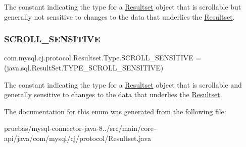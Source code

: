 The constant indicating the type for a {\ttfamily \mbox{\hyperlink{interfacecom_1_1mysql_1_1cj_1_1protocol_1_1_resultset}{Resultset}}} object that is scrollable but generally not sensitive to changes to the data that underlies the {\ttfamily \mbox{\hyperlink{interfacecom_1_1mysql_1_1cj_1_1protocol_1_1_resultset}{Resultset}}}. \mbox{\label{enumcom_1_1mysql_1_1cj_1_1protocol_1_1_resultset_1_1_type_a61adf90ea3124efe223bb2b80b921233}} 
\subsubsection{\texorpdfstring{S\+C\+R\+O\+L\+L\+\_\+\+S\+E\+N\+S\+I\+T\+I\+VE}{SCROLL\_SENSITIVE}}
{\footnotesize\ttfamily com.\+mysql.\+cj.\+protocol.\+Resultset.\+Type.\+S\+C\+R\+O\+L\+L\+\_\+\+S\+E\+N\+S\+I\+T\+I\+VE =(java.\+sql.\+Result\+Set.\+T\+Y\+P\+E\+\_\+\+S\+C\+R\+O\+L\+L\+\_\+\+S\+E\+N\+S\+I\+T\+I\+VE)}

The constant indicating the type for a {\ttfamily \mbox{\hyperlink{interfacecom_1_1mysql_1_1cj_1_1protocol_1_1_resultset}{Resultset}}} object that is scrollable and generally sensitive to changes to the data that underlies the {\ttfamily \mbox{\hyperlink{interfacecom_1_1mysql_1_1cj_1_1protocol_1_1_resultset}{Resultset}}}. 

The documentation for this enum was generated from the following file\+:\begin{DoxyCompactItemize}
\item 
pruebas/mysql-\/connector-\/java-\/8../src/main/core-\/api/java/com/mysql/cj/protocol/Resultset.\+java\end{DoxyCompactItemize}

